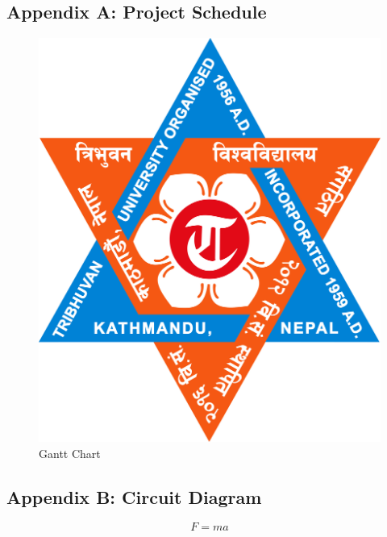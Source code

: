 \documentclass{ioereport}
\begin{document}
    \subsection*{Appendix A: Project Schedule}
    \begin{figure}[H]
        \centering
        \includegraphics[angle=90, origin=c, height=0.4\textheight]{TU_Logo.jpg}
        \caption{Gantt Chart}
        \label{fig:gantt}
    \end{figure}
    
    \pagebreak
    
    \subsection*{Appendix B: Circuit Diagram}

    \begin{equation}
        F = ma 
    \end{equation}

\pagebreak



\end{document}
